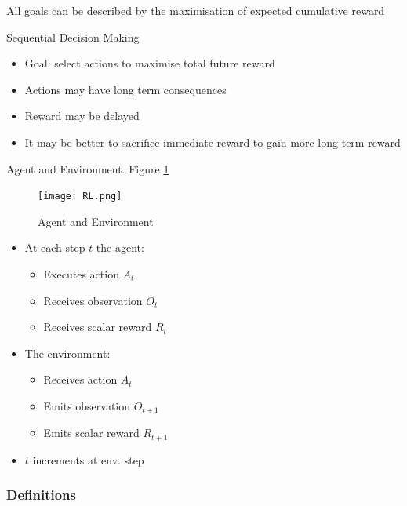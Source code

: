 \documentclass[english]{article}
\begin{document}
\begin{definition}
All goals can be described by the maximisation of expected
cumulative reward
\end{definition}



\item 
 {Sequential Decision Making}
\begin{itemize}
    \item Goal: select actions to maximise total future reward
    \item Actions may have long term consequences
    \item Reward may be delayed
    \item It may be better to sacrifice immediate reward to gain more
long-term reward
\end{itemize}
 



\item {Agent and Environment}. Figure \ref{Agent and Environment}
    \begin{figure}
        \centering
        \texttt{[image: RL.png]}
        \caption{Agent and Environment}
        \label{Agent and Environment}
    \end{figure}
  
 
\begin{itemize}
    \item At each step $t$ the agent:
    \begin{itemize}
        \item Executes action $A_t$
        \item Receives observation $O_t$
        \item Receives scalar reward $R_t$
    \end{itemize}
    \item The environment:
    \begin{itemize}
        \item Receives action $A_t$
        \item Emits observation $O_{t+1}$
        \item Emits scalar reward $R_{t+1}$
    \end{itemize}
    \item $t$ increments at env. step
\end{itemize}

 
\eenum

\subsubsection{Definitions}
\benum
\end{document}
